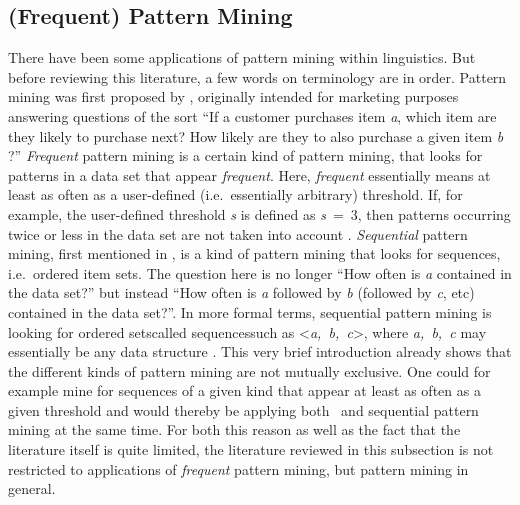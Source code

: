 \subsection{(Frequent) Pattern Mining}
\label{ssec:introresfpm}
There have been some applications of pattern mining within linguistics.
But before reviewing this literature, a few words on terminology are in order.
Pattern mining was first proposed by \citet{agrawal_mining_1993}, originally intended for marketing purposes answering questions of the sort
``If a customer purchases item \emph{a}, which item are they likely to purchase next?
How likely are they to also purchase a given item \emph{b} \citep[]{han_frequent_2007}?''
\emph{Frequent} pattern mining is a certain kind of pattern mining, that looks for patterns in a data set that appear \emph{frequent}.
Here, \emph{frequent} essentially means at least as often as a user-defined (i.e.~essentially arbitrary) threshold.
If, for example, the user-defined threshold \emph{s} is defined as \emph{s}~=~3, then patterns occurring twice or less in the data set are not taken into account \citep[]{han_data_2012}.
\emph{Sequential} pattern mining, first mentioned in \citet{agrawal_mining_1995}, is a kind of pattern mining that looks for sequences, i.e.~ordered item sets.
The question here is no longer ``How often is \emph{a} contained in the data set?'' but instead ``How often is \emph{a} followed by \emph{b} (followed by \emph{c}, etc) contained in the data set?''.
In more formal terms, sequential pattern mining is looking for ordered sets\dash called sequences\dash such as <\emph{a,~b,~c}>, where \emph{a,~b,~c} may essentially be any data structure \citep[]{han_frequent_2007}.
This very brief introduction already shows that the different kinds of pattern mining are not mutually exclusive.
One could for example mine for sequences of a given kind that appear at least as often as a given threshold and would thereby be applying both \fpmlower\ and sequential pattern mining at the same time.
For both this reason as well as the fact that the literature itself is quite limited, the literature reviewed in this subsection is not restricted to applications of \emph{frequent} pattern mining, but pattern mining in general.

